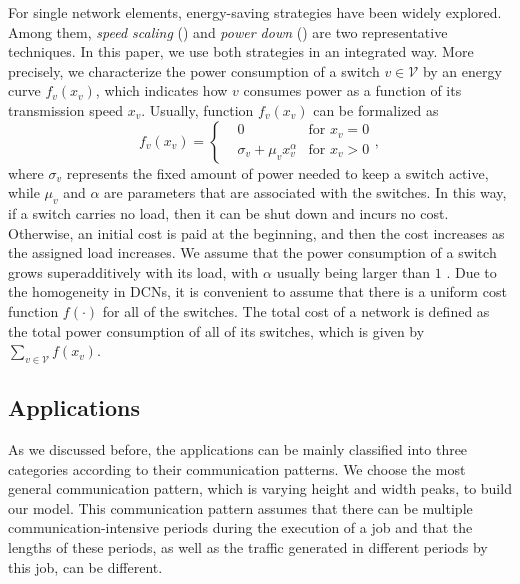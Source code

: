 \documentclass[journal,single-space,two column,twoside,10pt]{IEEEtran}
\begin{document}
For single network elements, energy-saving strategies have been widely explored. Among them, \emph{speed scaling} (\cite{Yao_Demers-1995, Bansal_Kimbrel-2007, Gunaratne_Christensen-2008, Andrews_Fernandez-2010}) and \emph{power down} (\cite{Nedevschi_Popa-2008, Parnaby_Zimmerman-2008}) are two representative techniques. 
In this paper, we use both strategies in an integrated way. More precisely, we characterize the power consumption of a switch $v \in \mathcal{V}$ by an energy curve $f_v(x_v)$, which indicates how $v$ consumes power as a function of its transmission speed $x_v$. Usually, function $f_v(x_v)$ can be formalized as
\begin{equation}
	\label{eq:cost_function}
	f_v(x_v)=\left\{
	\begin{aligned}
		& 0 & \mbox{for } x_v = 0 \\
		& \sigma_v + \mu_v x_v^{\alpha} & \mbox{for } x_v > 0
	\end{aligned}
	\right.,
\end{equation}
where $\sigma_v$ represents the fixed amount of power needed to keep a switch active, while $\mu_v$ and $\alpha$ are parameters that are associated with the switches. In this way, if a switch carries no load, then it can be shut down and incurs no cost. Otherwise, an initial cost is paid at the beginning, and then the cost increases as the assigned load increases. We assume that the power consumption of a switch grows superadditively with its load, with $\alpha$ usually being larger than $1$ \cite{Andrews_Fernandez-2010}. Due to the homogeneity in DCNs, it is convenient to assume that there is a uniform cost function $f(\cdot)$ for all of the switches. The total cost of a network is defined as the total power consumption of all of its switches, which is given by $\sum_{v \in \mathcal{V}} f(x_v)$.

\vspace{-0.2cm}

\subsection{Applications}

As we discussed before, the applications can be mainly classified into three categories according to their communication patterns. We choose the most general communication pattern, which is varying height and width peaks, to build our model. This communication pattern assumes that there can be multiple communication-intensive periods during the execution of a job and that the lengths of these periods, as well as the traffic generated in different periods by this job, can be different.
\end{document}
